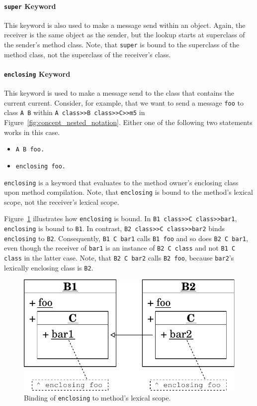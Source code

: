 \paragraph{\texttt{super} Keyword}
This keyword is also used to make a message send within an object. Again, the receiver is the same object as the sender, but the lookup starts at superclass of the sender's method class. Note, that \texttt{super} is bound to the superclass of the method class, not the superclass of the receiver's class.

\paragraph{\texttt{enclosing} Keyword}
This keyword is used to make a message send to the class that contains the current current. Consider, for example, that we want to send a message \texttt{foo} to class \texttt{A B} within \texttt{A class>>B class>>C>>m5} in Figure~\ref{fig:concept_nested_notation}. Either one of the following two statements works in this case.

\begin{itemize}
	\item \texttt{A B foo.}
	\item \texttt{enclosing foo.}
\end{itemize}

\texttt{enclosing} is a keyword that evaluates to the method owner's enclosing class upon method compilation. Note, that \texttt{enclosing} is bound to the method's lexical scope, not the receiver's lexical scope.

Figure~\ref{fig:concept_lexical_thisouter} illustrates how \texttt{enclosing} is bound. In \texttt{B1 class>>C class>>bar1}, \texttt{enclosing} is bound to \texttt{B1}. In contrast, \texttt{B2 class>>C class>>bar2} binds \texttt{enclosing} to \texttt{B2}. Consequently, \texttt{B1 C bar1} calls \texttt{B1 foo} and so does \texttt{B2 C bar1}, even though the receiver of \texttt{bar1} is an instance of \texttt{B2 C class} and not \texttt{B1 C class} in the latter case. Note, that \texttt{B2 C bar2} calls \texttt{B2 foo}, because \texttt{bar2}'s lexically enclosing class is \texttt{B2}.

\begin{figure}[!htp]
	\includegraphics[scale=1]{nested_lexical1.pdf}
	\centering
	\caption{Binding of \texttt{enclosing} to method's lexical scope.}
	\label{fig:concept_lexical_thisouter}
\end{figure}

